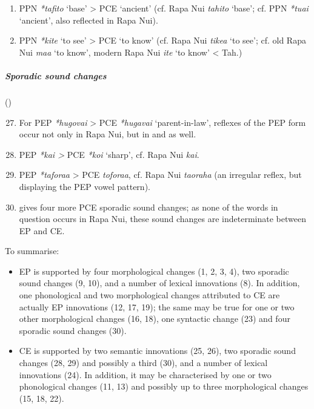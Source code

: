 \begin{enumerate}
\item 
{}PPN \textit{*tafito} ‘base’ {\textgreater} PCE ‘ancient’ (cf. Rapa Nui \textit{tahito} ‘base’; cf. PPN \textit{*tuai} ‘ancient’, also reflected in Rapa Nui).   

\item 
{}PPN \textit{*kite} ‘to see’ {\textgreater} PCE ‘to know’ (cf. Rapa Nui \textit{tike{\ꞌ}a} ‘to see’; cf. old Rapa Nui \textit{ma{\ꞌ}a} ‘to know’, modern Rapa Nui \textit{{\ꞌ}ite} ‘to know’ {\textless} Tah.)   

\end{enumerate}

\subparagraph{Sporadic sound changes} (\citealt[41, 96–97]{Marck2000})

\begin{enumerate}
\setcounter{enumi}{26}
\item 
For PEP \textit{*hugovai} {\textgreater} PCE \textit{*hugavai} ‘parent-in-law’, reflexes of the PEP form occur not only in Rapa Nui, but in  and  as well.   

\item 
PEP \textit{*kai {\textgreater}} PCE \textit{*koi} ‘sharp’, cf. Rapa Nui \textit{ka{\ꞌ}i}.   

\item 
PEP \textit{*tafora{\ꞌ}a} {\textgreater} PCE \textit{tofora{\ꞌ}a}, cf. Rapa Nui \textit{ta{\ꞌ}oraha} (an irregular reflex, but displaying the PEP vowel pattern).   

\item 
\citet{Marck2000} gives four more PCE sporadic sound changes; as none of the words in question occurs in Rapa Nui, these sound changes are indeterminate between EP and CE.   

\end{enumerate}

\newpage 
To summarise: 

\begin{itemize}
\item 
EP is supported by four morphological changes (1, 2, 3, 4), two sporadic sound changes (9, 10), and a number of lexical innovations (8). In addition, one phonological and two morphological changes attributed to CE are actually EP innovations (12, 17, 19); the same may be true for one or two other morphological changes (16, 18), one syntactic change (23) and four sporadic sound changes (30).

\item 
CE is supported by two semantic innovations (25, 26), two sporadic sound changes (28, 29) and possibly a third (30), and a number of lexical innovations (24). In addition, it may be characterised by one or two phonological changes (11, 13) and possibly up to three morphological changes (15, 18, 22). 

\end{itemize}

